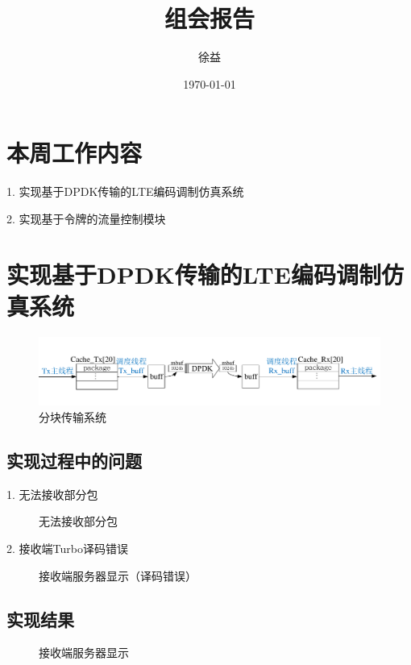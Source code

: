 \documentclass{article}
\title{组会报告}
\author{徐益}
\date{\today}
\begin{document}
	
\maketitle


\section{本周工作内容}

1. 实现基于DPDK传输的LTE编码调制仿真系统

2. 实现基于令牌的流量控制模块

\section{实现基于DPDK传输的LTE编码调制仿真系统}
\begin{figure}[H]
	\centering
	\includegraphics[width = \textwidth]{frame_sys.pdf}
	\caption{分块传输系统}
\end{figure}
\subsection{实现过程中的问题}
1. 无法接收部分包
\begin{figure}[H]
	\centering
	\caption{无法接收部分包}
\end{figure}
2. 接收端Turbo译码错误
\begin{figure}[H]
	\centering
	\caption{接收端服务器显示（译码错误）}
\end{figure}
\subsection{实现结果}
\begin{figure}[H]
	\centering
	\caption{接收端服务器显示}
\end{figure}

\end{document}
